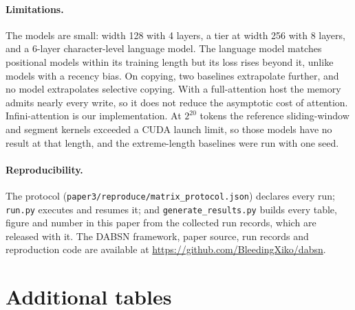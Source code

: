 \documentclass[11pt]{article}
\begin{document}
\paragraph{Limitations.} The models are small: width 128 with 4 layers, a tier at
width 256 with 8 layers, and a 6-layer character-level language model. The language
model matches positional models within its training length but its loss rises beyond
it, unlike models with a recency bias. On copying, two baselines extrapolate further,
and no model extrapolates selective copying. With a full-attention host the memory
admits nearly every write, so it does not reduce the asymptotic cost of attention.
Infini-attention is our implementation. At $2^{20}$ tokens the reference
sliding-window and segment kernels exceeded a CUDA launch limit, so those models have
no result at that length, and the extreme-length baselines were run with one seed.

\paragraph{Reproducibility.} The protocol (\texttt{paper3/reproduce/matrix\_protocol.json})
declares every run; \texttt{run.py} executes and resumes it; and
\texttt{generate\_results.py} builds every table, figure and number in this paper from
the collected run records, which are released with it. The DABSN framework,
paper source, run records and reproduction code are available at
\url{https://github.com/BleedingXiko/dabsn}.

\clearpage
\appendix
\section{Additional tables}




\clearpage
\end{document}
